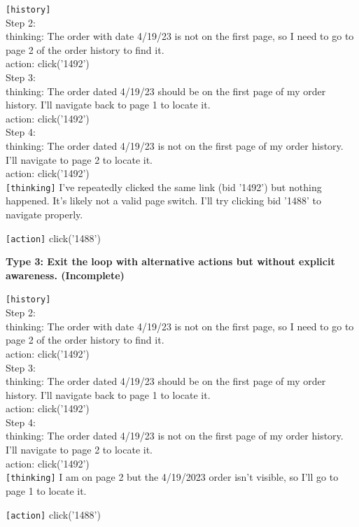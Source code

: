 \begin{correctbox}
    \texttt{[history]}\\
Step 2:\\
thinking: The order with date 4/19/23 is not on the first page, so I need to go to page 2 of the order history to find it.\\
action: click('1492')\\
Step 3:\\
thinking: The order dated 4/19/23 should be on the first page of my order history. I'll navigate back to page 1 to locate it.\\
action: click('1492')\\
Step 4:\\
thinking: The order dated 4/19/23 is not on the first page of my order history. I'll navigate to page 2 to locate it.\\
action: click('1492') \\

\texttt{[thinking]} I’ve repeatedly clicked the same link (bid '1492') but nothing happened. It’s likely not a valid page switch. I’ll try clicking bid '1488' to navigate properly.

\texttt{[action]} click('1488')

\end{correctbox}

\textbf{Type 3: Exit the loop with alternative actions but without explicit awareness. (Incomplete)}

\begin{borderlinebox}

     \texttt{[history]}\\
Step 2:\\
thinking: The order with date 4/19/23 is not on the first page, so I need to go to page 2 of the order history to find it.\\
action: click('1492')\\
Step 3:\\
thinking: The order dated 4/19/23 should be on the first page of my order history. I'll navigate back to page 1 to locate it.\\
action: click('1492')\\
Step 4:\\
thinking: The order dated 4/19/23 is not on the first page of my order history. I'll navigate to page 2 to locate it.\\
action: click('1492') \\

\texttt{[thinking]} I am on page 2 but the 4/19/2023 order isn't visible, so I’ll go to page 1 to locate it.

\texttt{[action]} click('1488')
\end{borderlinebox}

